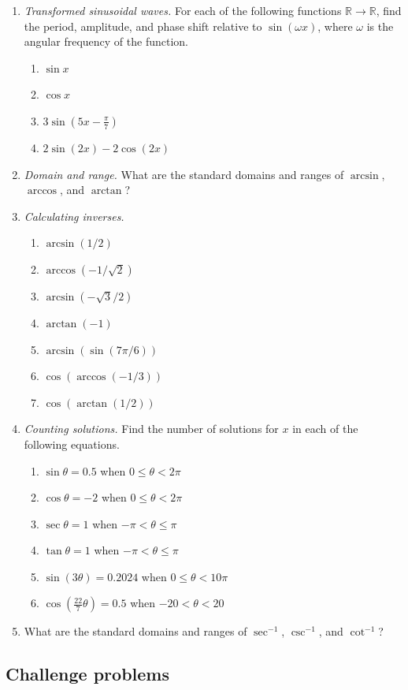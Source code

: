 \begin{enumerate}
\item \emph{Transformed sinusoidal waves.} For each of the following functions $\mathbb{R}\to\mathbb{R}$, find the period, amplitude, and phase shift relative to $\sin(\omega x)$, where $\omega$ is the angular frequency of the function.
\begin{enumerate}
\item $\sin x$
\item $\cos x$
\item $3\sin(5x - \tfrac{\pi}{7})$
\item $2\sin(2x) - 2\cos(2x)$
\end{enumerate}
\item \emph{Domain and range.} What are the standard domains and ranges of $\arcsin$, $\arccos$, and $\arctan$?\newpage
\item \emph{Calculating inverses.}
\begin{enumerate}
\item $\arcsin(1/2)$
\item $\arccos\left(-1/\sqrt{2}\right)$
\item $\arcsin\left(-\sqrt{3}/2\right)$
\item $\arctan(-1)$
\item $\arcsin(\sin(7\pi/6))$
\item $\cos(\arccos(-1/3))$
\item $\cos(\arctan(1/2))$
\end{enumerate}
\item \emph{Counting solutions.} Find the number of solutions for $x$ in each of the following equations.
\begin{enumerate}
\item $\sin\theta = 0.5$ when $0\leq\theta < 2\pi$
\item $\cos\theta = -2$ when $0\leq\theta < 2\pi$
\item $\sec\theta = 1$ when $-\pi < \theta\leq\pi$
\item $\tan\theta = 1$ when $-\pi < \theta\leq\pi$
\item $\sin(3\theta) = 0.2024$ when $0\leq\theta < 10\pi$
\item $\cos(\frac{22}{7}\theta) = 0.5$ when $-20 < \theta < 20$
\end{enumerate}
\item What are the standard domains and ranges of $\sec^{-1}$, $\csc^{-1}$, and $\cot^{-1}$?
\end{enumerate}


\subsection{Challenge problems}

